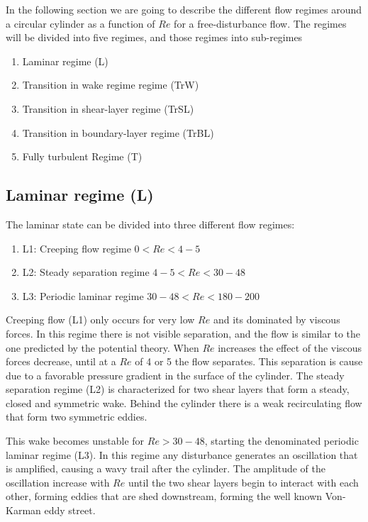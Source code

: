 \documentclass[journal]{new-aiaa}
\begin{document}
In the following section we are going to describe the different flow regimes around a circular cylinder as a function of $Re$ for a free-disturbance flow. The regimes will be divided into five regimes, and those regimes into sub-regimes

\begin{enumerate}[label=(\roman*)]
\item Laminar regime (L)
\item Transition in wake regime regime (TrW)
\item Transition in shear-layer regime (TrSL)
\item Transition in boundary-layer regime (TrBL)
\item Fully turbulent Regime (T)
\end{enumerate}

\subsection{Laminar regime (L)}

The laminar state can be divided into three different flow regimes:

\begin{enumerate}[label=(\roman*)]
\item L1: Creeping flow regime  $0<Re<4-5$
\item L2: Steady separation regime $4-5<Re<30-48$
\item L3: Periodic laminar regime $30-48<Re<180-200$
\end{enumerate}

Creeping flow (L1) only occurs for very low $Re$ and its dominated by viscous forces. In this regime there is not visible separation, and the flow is similar to the one predicted by the potential theory.  When  $Re$ increases the effect of the viscous forces decrease, until at a $Re$ of 4 or 5 the flow separates. This separation is cause due to a favorable pressure gradient in the surface of the cylinder. The steady separation regime (L2) is characterized for two shear layers that form a steady, closed and symmetric wake. Behind the cylinder there is a weak recirculating flow that form two symmetric eddies. 

This wake becomes unstable for $Re > 30-48$, starting the denominated periodic laminar regime (L3). In this regime any disturbance generates an oscillation that is amplified, causing a wavy trail after the cylinder. The amplitude of the oscillation increase with $Re$ until the two shear layers begin to interact with each other, forming eddies that are shed downstream, forming the well known Von-Karman eddy street. 
\end{document}
